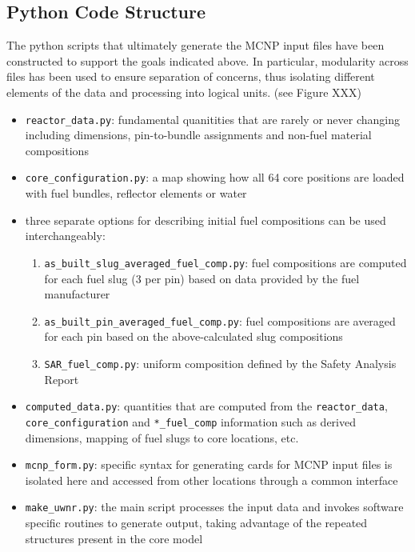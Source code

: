 \documentclass{UWNR_modeling}
\begin{document}
\subsection{Python Code Structure}\label{ssection:code_struct}

The python scripts that ultimately generate the MCNP input files have been
constructed to support the goals indicated above.  In particular, modularity
across files has been used to ensure separation of concerns, thus isolating
different elements of the data and processing into logical units.  (see Figure
XXX)

\begin{itemize}
\item \texttt{reactor\_data.py}: fundamental quanitities that are rarely or never
  changing including dimensions, pin-to-bundle assignments and non-fuel
  material compositions
\item \texttt{core\_configuration.py}: a map showing how all 64 core positions are
  loaded with fuel bundles, reflector elements or water
\item three separate options for describing initial fuel compositions can be
  used interchangeably:
  \begin{enumerate}
  \item \texttt{as\_built\_slug\_averaged\_fuel\_comp.py}: fuel compositions are
    computed for each fuel slug (3 per pin) based on data provided by the fuel
    manufacturer
  \item \texttt{as\_built\_pin\_averaged\_fuel\_comp.py}: fuel compositions are
    averaged for each pin based on the above-calculated slug compositions
  \item \texttt{SAR\_fuel\_comp.py}: uniform composition defined by the Safety Analysis
    Report
  \end{enumerate}
\item \texttt{computed\_data.py}: quantities that are computed from the \texttt{reactor\_data},\\ \texttt{core\_configuration} and \texttt{*\_fuel\_comp} information such as derived dimensions, mapping of fuel slugs to core locations, etc.
\item \texttt{mcnp\_form.py}: specific syntax for generating cards for MCNP input files is isolated here and accessed from other locations through a common interface
\item \texttt{make\_uwnr.py}: the main script processes the input data and invokes software specific routines to generate output, taking advantage of the repeated structures present in the core model
\end{itemize}
\end{document}
